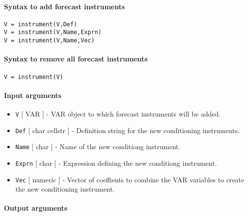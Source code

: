 


	\paragraph{Syntax to add forecast
instruments}\label{syntax-to-add-forecast-instruments}

\begin{verbatim}
V = instrument(V,Def)
V = instrument(V,Name,Exprn)
V = instrument(V,Name,Vec)
\end{verbatim}

\paragraph{Syntax to remove all forecast
instruments}\label{syntax-to-remove-all-forecast-instruments}

\begin{verbatim}
V = instrument(V)
\end{verbatim}

\paragraph{Input arguments}\label{input-arguments}

\begin{itemize}
\item
  \texttt{V} {[} VAR {]} - VAR object to which forecast instruments will
  be added.
\item
  \texttt{Def} {[} char \textbar{} cellstr {]} - Definition string for
  the new conditioning instruments.
\item
  \texttt{Name} {[} char {]} - Name of the new conditiong instrument.
\item
  \texttt{Exprn} {[} char {]} - Expression defining the new conditiong
  instrument.
\item
  \texttt{Vec} {[} numeric {]} - Vector of coeffients to combine the VAR
  variables to create the new conditioning instrument.
\end{itemize}

\paragraph{Output arguments}\label{output-arguments}


